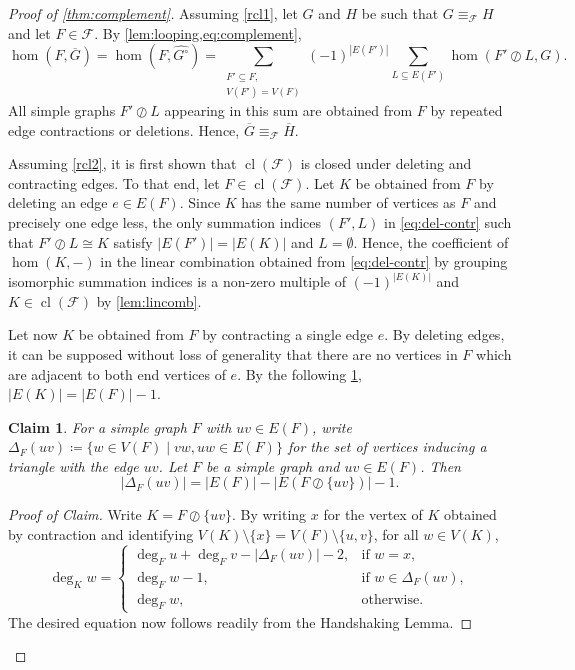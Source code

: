 \documentclass[3p,final]{elsarticle}
\DeclareMathOperator{\cl}{cl}
\newtheorem{claim}{Claim}[theorem]
\newenvironment{claimproof}[1][Proof of Claim]{\begin{proof}[#1] \renewcommand{\qedsymbol}{$\lrcorner$}}{ \end{proof}}
\begin{document}
	\begin{proof}[Proof of \cref{thm:complement}]
		Assuming \ref{rcl1}, let $G$ and $H$ be such that $G \equiv_{\mathcal{F}} H$ and let $F \in \mathcal{F}$. By \cref{lem:looping,eq:complement},
		\begin{equation} \label{eq:del-contr}
			\hom(F, \overline{G}) 
			= \hom(F, \widehat{G^\circ})
			= \sum_{\substack{F' \subseteq F, \\ V(F') = V(F)}} (-1)^{|E(F')|}  \sum_{L \subseteq E(F')} \hom(F' \oslash L, G).
		\end{equation}
		All simple graphs $F' \oslash L$ appearing in this sum are obtained from $F$ by repeated edge contractions or deletions. Hence, $\overline{G} \equiv_{\mathcal{F}} \overline{H}$.
		
		Assuming \ref{rcl2}, it is first shown that $\cl(\mathcal{F})$ is closed under deleting and contracting edges. 
		To that end, let $F \in \cl(\mathcal{F})$. Let $K$ be obtained from $F$ by deleting an edge $e \in E(F)$.
		Since $K$ has the same number of vertices as $F$ and precisely one edge less, the only summation indices $(F', L)$ in \cref{eq:del-contr} such that $F' \oslash L \cong K$
		satisfy 
		$|E(F')| = |E(K)|$ and $L = \emptyset$.
		Hence, the coefficient of $\hom(K, -)$ in the linear combination obtained from \cref{eq:del-contr} by grouping isomorphic summation indices is a non-zero multiple of $(-1)^{|E(K)|}$ and $K \in \cl(\mathcal{F})$ by \cref{lem:lincomb}.
		
		Let now $K$ be obtained from $F$ by contracting a single edge $e$.
		By deleting edges, it can be supposed without loss of generality that there are no vertices in $F$ which are adjacent to both end vertices of $e$.
		By the following \cref{obs:edges-contract}, $|E(K)| = |E(F)| - 1$.
		
			\begin{claim} \label{obs:edges-contract}
			For a simple graph $F$ with $uv \in E(F)$, write $\Delta_F(uv) \coloneqq \{w \in V(F) \mid vw, uw \in E(F)\}$ for the set of vertices inducing a triangle with the edge $uv$.
			Let $F$ be a simple graph and $uv \in E(F)$. Then
			\[
			|\Delta_F(uv)| = |E(F)| - |E(F \oslash \{uv\})| - 1.
			\]
		\end{claim}
		\begin{claimproof}
			Write $K = F \oslash \{uv\}$.
			By writing $x$ for the vertex of $K$ obtained by contraction and identifying $V(K) \setminus \{x\} = V(F) \setminus \{u, v\}$, for all $w \in V(K)$,
			\[
			\deg_{K} w = \begin{cases}
				\deg_F u + \deg_F v - |\Delta_{F}(uv)| - 2, &\text{if } w = x,\\
				\deg_F w - 1, & \text{if } w \in \Delta_{F}(uv), \\
				\deg_F w, & \text{otherwise}.
			\end{cases}
			\]
			The desired equation now follows readily from the Handshaking Lemma.
		\end{claimproof}
		

\end{proof}
\end{document}
